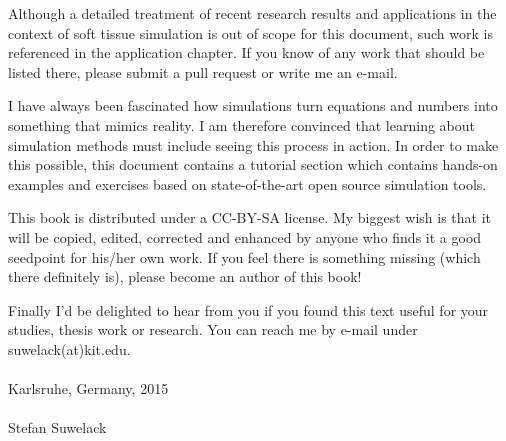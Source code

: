 Although a detailed treatment of recent research results and applications in the context of soft tissue simulation is out of scope for this document, such work is referenced in the application chapter. If you know of any work that should be listed there, please submit a pull request or write me an e-mail.

I have always been fascinated how simulations turn equations and numbers into something that mimics reality. I am therefore convinced that learning about simulation methods must include seeing this process in action. In order to make this possible, this document contains a tutorial section which contains hands-on examples and exercises based on state-of-the-art open source simulation tools.

This book is distributed under a CC-BY-SA license. My biggest wish is that it will be copied, edited, corrected and enhanced by anyone who finds it a good seedpoint for his/her own work. If you feel there is something missing (which there definitely is), please become an author of this book! 

Finally I'd be delighted to hear from you if you found this text useful for your studies, thesis work or research. You can reach me by e-mail under suwelack(at)kit.edu. \\
\\
Karlsruhe, Germany, 2015\\
\\
Stefan Suwelack




